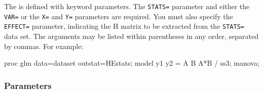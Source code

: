 The  is defined with keyword parameters.  The \texttt{STATS=}
parameter and either the \texttt{VAR=} or the \texttt{X=} and \texttt{Y=} parameters are required.
You must also specify the \texttt{EFFECT=} parameter, indicating the H matrix
to be extracted from the \texttt{STATS=} data set.
The arguments may be listed within parentheses in any order, separated
by commas. For example:

\begin{listing}
 proc glm data=dataset outstat=HEstats;
    model y1 y2  = A B A*B / ss3;
    manova;
\end{listing}

\subsubsection*{Parameters}
